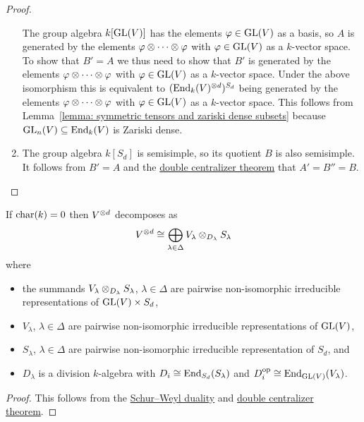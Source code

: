 \begin{proof}
\begin{enumerate}
      The group algebra $k[\operatorname{GL}(V)]$ has the elements $\varphi \in \operatorname{GL}(V)$ as a basis, so $A$ is generated by the elements $\varphi \mathbin{\otimes} \dotsb \mathbin{\otimes} \varphi$ with $\varphi \in \operatorname{GL}(V)$ as a $k$-vector space.
      To show that $B' = A$ we thus need to show that $B'$ is generated by the elements $\varphi \mathbin{\otimes} \dotsb \mathbin{\otimes} \varphi$ with $\varphi \in \operatorname{GL}(V)$ as a $k$-vector space.
      Under the above isomorphism this is equivalent to $(\operatorname{End}_k(V)^{\mathbin{\otimes} d})^{S_d}$ being generated by the elements $\varphi \mathbin{\otimes} \dotsb \mathbin{\otimes} \varphi$ with $\varphi \in \operatorname{GL}(V)$ as a $k$-vector space.
      This follows from Lemma~\ref{lemma: symmetric tensors and zariski dense subsets} because $\operatorname{GL}_n(V) \subseteq \operatorname{End}_k(V)$ is Zariski dense.
    \item
      The group algebra $k[S_d]$ is semisimple, so its quotient $B$ is also semisimple.
      It follows from $B' = A$ and the \hyperref[corollary: special double centralizer theorem]{double centralizer theorem} that $A' = B'' = B$.
    \qedhere
  \end{enumerate}
\end{proof}




\begin{corollary}
  If $\operatorname{char}(k) = 0$ then $V^{\mathbin{\otimes} d}$ decomposes as
  \[
          V^{\mathbin{\otimes} d}
    \cong \bigoplus_{\lambda \in \Delta} V_\lambda \mathbin{\otimes}_{D_\lambda} S_\lambda
  \]
  where
  \begin{itemize}
    \item
      the summands $V_\lambda \mathbin{\otimes}_{D_\lambda} S_\lambda$, $\lambda \in \Delta$ are pairwise non-isomorphic irreducible representations of $\operatorname{GL}(V) \times S_d$,
    \item
      $V_\lambda$, $\lambda \in \Delta$ are pairwise non-isomorphic irreducible representations of $\operatorname{GL}(V)$,
    \item
      $S_\lambda$, $\lambda \in \Delta$ are pairwise non-isomorphic irreducible representation of $S_d$, and
    \item
      $D_\lambda$ is a division $k$-algebra with $D_i \cong \operatorname{End}_{S_d}(S_\lambda)$ and $D_i^{\operatorname{op}} \cong \operatorname{End}_{\operatorname{GL}(V)}(V_\lambda)$.
  \end{itemize}
\end{corollary}


\begin{proof}
  This follows from the \hyperref[theorem: schur weyl duality]{Schur--Weyl duality} and \hyperref[corollary: special double centralizer theorem]{double centralizer theorem}.
\end{proof}


